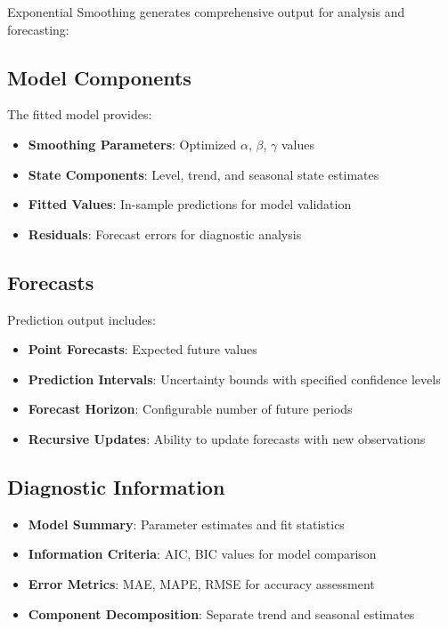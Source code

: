 Exponential Smoothing generates comprehensive output for analysis and forecasting:

\subsection{Model Components}
The fitted model provides:
\begin{itemize}
\item \textbf{Smoothing Parameters}: Optimized $\alpha$, $\beta$, $\gamma$ values
    \item \textbf{State Components}: Level, trend, and seasonal state estimates
    \item \textbf{Fitted Values}: In-sample predictions for model validation
    \item \textbf{Residuals}: Forecast errors for diagnostic analysis
\end{itemize}

\subsection{Forecasts}
Prediction output includes:
\begin{itemize}
    \item \textbf{Point Forecasts}: Expected future values
    \item \textbf{Prediction Intervals}: Uncertainty bounds with specified confidence levels
    \item \textbf{Forecast Horizon}: Configurable number of future periods
    \item \textbf{Recursive Updates}: Ability to update forecasts with new observations
\end{itemize}

\subsection{Diagnostic Information}
\begin{itemize}
    \item \textbf{Model Summary}: Parameter estimates and fit statistics
    \item \textbf{Information Criteria}: AIC, BIC values for model comparison
    \item \textbf{Error Metrics}: MAE, MAPE, RMSE for accuracy assessment
    \item \textbf{Component Decomposition}: Separate trend and seasonal estimates
\end{itemize}

